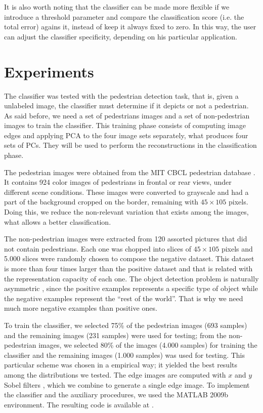 \documentclass[10pt, conference, compsocconf]{IEEEtran}
\begin{document}
It is also worth noting that the classifier can be made more flexible if we introduce a threshold parameter and compare the classification score (i.e. the total error) agains it, instead of keep it always fixed to zero. In this way, the user can adjust the classifier specificity, depending on his particular application.


\section{Experiments}

The classifier was tested with the pedestrian detection task, that is, given a unlabeled image, the classifier must determine if it depicts or not a pedestrian. As said before, we need a set of pedestrians images and a set of non-pedestrian images to train the classifier. This training phase consists of computing image edges and applying PCA to the four image sets separately, what produces four sets of PCs. They will be used to perform the reconstructions in the classification phase.

The pedestrian images were obtained from the MIT CBCL pedestrian database \cite{cbcl}. It contains 924 color images of pedestrians in frontal or rear views, under different scene conditions. These images were converted to grayscale and had a part of the background cropped on the border, remaining with $45 \times 105$ pixels. Doing this, we reduce the non-relevant variation that exists among the images, what allows a better classification.

The non-pedestrian images were extracted from 120 assorted pictures that did not contain pedestrians. Each one was chopped into slices of $45 \times 105$ pixels and 5.000 slices were randomly chosen to compose the negative dataset. This dataset is more than four times larger than the positive dataset and that is related with the representation capacity of each one. The object detection problem is naturally asymmetric \cite{jiang09}, since the positive examples represents a specific type of object while the negative examples represent the ``rest of the world''. That is why we need much more negative examples than positive ones.

To train the classifier, we selected 75\% of the pedestrian images (693 samples) and the remaining images (231 samples) were used  for testing; from the non-pedestrian images, we selected 80\% of the images (4.000 samples) for training the classifier and the remaining images (1.000 samples) was used for testing. This particular scheme was chosen in a empirical way; it yielded the best results among the distributions we tested. The edge images are computed with $x$ and $y$ Sobel filters \cite{gonzalez01}, which we combine to generate a single edge image. To implement the classifier and the auxiliary procedures, we used the MATLAB 2009b environment. The resulting code is available at \cite{code}.
\end{document}
